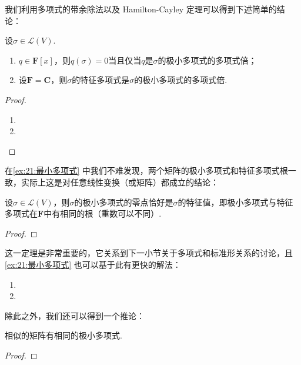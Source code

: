 我们利用多项式的带余除法以及 Hamilton-Cayley 定理可以得到下述简单的结论：
\begin{theorem}
    设$\sigma\in \mathcal{L}(V)$.
    \begin{enumerate}
        \item $q\in\mathbf{F}[x]$，则$q(\sigma)=0$当且仅当$q$是$\sigma$的极小多项式的多项式倍；

        \item 设$\mathbf{F}=\mathbf{C}$，则$\sigma$的特征多项式是$\sigma$的极小多项式的多项式倍.
    \end{enumerate}
\end{theorem}

\begin{proof}
    \begin{enumerate}
        \item

        \item
    \end{enumerate}
\end{proof}

在\autoref{ex:21:最小多项式} 中我们不难发现，两个矩阵的极小多项式和特征多项式根一致，实际上这是对任意线性变换（或矩阵）都成立的结论：
\begin{theorem} \label{thm:21:极小多项式与特征多项式相同根}
    设$\sigma\in \mathcal{L}(V)$，则$\sigma$的极小多项式的零点恰好是$\sigma$的特征值，即极小多项式与特征多项式在$\mathbf{F}$中有相同的根（重数可以不同）.
\end{theorem}

\begin{proof}

\end{proof}

这一定理是非常重要的，它关系到下一小节关于多项式和标准形关系的讨论，且\autoref{ex:21:最小多项式} 也可以基于此有更快的解法：

\begin{solution}
    \begin{enumerate}
        \item

        \item
    \end{enumerate}
\end{solution}

除此之外，我们还可以得到一个推论：
\begin{corollary}
    相似的矩阵有相同的极小多项式.
\end{corollary}

\begin{proof}

\end{proof}

